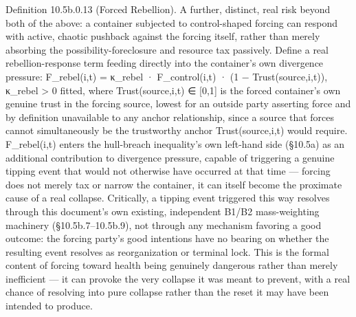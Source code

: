 \documentclass[
]{article}
\begin{document}
Definition 10.5b.0.13 (Forced Rebellion). A further, distinct, real risk
beyond both of the above: a container subjected to control-shaped
forcing can respond with active, chaotic pushback against the forcing
itself, rather than merely absorbing the possibility-foreclosure and
resource tax passively. Define a real rebellion-response term feeding
directly into the container's own divergence pressure: F\_rebel(i,t) =
κ\_rebel · F\_control(i,t) · (1 − Trust(source,i,t)), κ\_rebel
\textgreater{} 0 fitted, where Trust(source,i,t) ∈ {[}0,1{]} is the
forced container's own genuine trust in the forcing source, lowest for an
outside party asserting force and by definition unavailable to any
anchor relationship, since a source that forces cannot simultaneously be
the trustworthy anchor Trust(source,i,t) would require. F\_rebel(i,t)
enters the hull-breach inequality's own left-hand side (§10.5a) as an
additional contribution to divergence pressure, capable of triggering a
genuine tipping event that would not otherwise have occurred at that
time --- forcing does not merely tax or narrow the container, it can
itself become the proximate cause of a real collapse. Critically, a
tipping event triggered this way resolves through this document's own
existing, independent B1/B2 mass-weighting machinery
(§10.5b.7--10.5b.9), not through any mechanism favoring a good outcome:
the forcing party's good intentions have no bearing on whether the
resulting event resolves as reorganization or terminal lock. This is the
formal content of forcing toward health being genuinely dangerous rather
than merely inefficient --- it can provoke the very collapse it was
meant to prevent, with a real chance of resolving into pure collapse
rather than the reset it may have been intended to produce.
\end{document}
